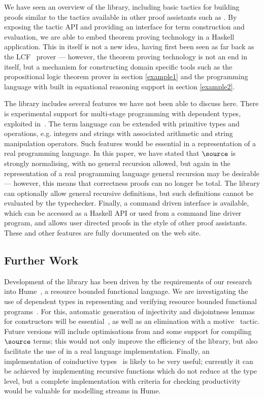 We have seen an overview of the \Ivor{} library, including basic
tactics for building proofs similar to the tactics available in other
proof assistants such as \Coq{}. By exposing the tactic API and
providing an interface for term construction and evaluation, we are
able to embed theorem proving technology in a Haskell
application. This in itself is not a new idea, having first been seen
as far back as the LCF~\cite{lcf-milner} prover --- however, the
theorem proving technology is not an end in itself, but a
mechanism for constructing domain specific tools such as the
propositional logic theorem prover in section \ref{example1} and the
programming language with built in equational reasoning support in
section \ref{example2}.

The library includes several features we have not been able to discuss
here. There is experimental support for multi-stage programming with
dependent types, exploited in~\cite{dtpmsp-gpce}.  The term language
can be extended with primitive types and operations, e.g. integers and
strings with associated arithmetic and string manipulation
operators. Such features would be essential in a representation of a
real programming language. In this paper, we have stated that
$\source$ is strongly normalising, with no general recursion allowed,
but again in the representation of a real programming language general
recursion may be desirable --- however, this means that correctness
proofs can no longer be total. The library can optionally allow
general recursive definitions, but such definitions cannot be
evaluated by the typechecker. Finally, a command driven interface is
available, which can be accessed as a Haskell API or used from a
command line driver program, and allows user directed proofs in the
style of other proof assistants. These and other features are fully
documented on the web site.

\subsection{Further Work}

Development of the library has been driven by the requirements of
our research into Hume~\cite{Hume-GPCE}, a resource bounded functional
language. We are investigating the use of dependent types in
representing and verifying resource bounded functional
programs~\cite{dt-framework}. For this, automatic generation of
injectivity and disjointness lemmas for constructors will be
essential~\cite{concon}, as well as an elimination with a
motive~\cite{elim-motive} tactic. Future versions will include
optimisations from \cite{brady-thesis} and some support for compiling
$\source$ terms; this would not only improve the efficiency of the
library, but also facilitate the use of \Ivor{} in a real language
implementation. Finally, an implementation of coinductive
types~\cite{coinductive} is likely to be very useful; currently it can
be achieved by implementing recursive functions which do not reduce at
the type level, but a complete implementation with criteria for
checking productivity would be valuable for modelling streams in Hume.
